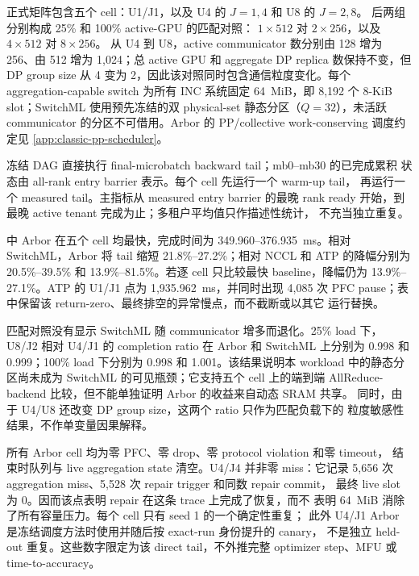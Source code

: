 正式矩阵包含五个 cell：U1/J1，以及 U4 的 $J=1,4$ 和 U8 的 $J=2,8$。
后两组分别构成 25\% 和 100\% active-GPU 的匹配对照：
$1\times512$ 对 $2\times256$，以及 $4\times512$ 对 $8\times256$。
从 U4 到 U8，active communicator 数分别由 128 增为 256、由 512 增为
1,024；总 active GPU 和 aggregate DP replica 数保持不变，但 DP group size
从 4 变为 2，因此该对照同时包含通信粒度变化。每个 aggregation-capable
switch 为所有 INC 系统固定 64~MiB，即 8,192 个 8-KiB slot；SwitchML
使用预先冻结的双 physical-set 静态分区（$Q=32$），未活跃 communicator
的分区不可借用。Arbor 的 PP/collective work-conserving 调度约定见
\cref{app:classic-pp-scheduler}。

冻结 DAG 直接执行 final-microbatch backward tail；mb0--mb30 的已完成累积
状态由 all-rank entry barrier 表示。每个 cell 先运行一个 warm-up tail，
再运行一个 measured tail。主指标从 measured entry barrier 的最晚 rank
ready 开始，到最晚 active tenant 完成为止；多租户平均值只作描述性统计，
不充当独立重复。

\begin{table}[t]
\centering
\small
\caption{70B Classic 3D final-microbatch backward-tail completion。时间单位
为 ms，越低越好；主指标取 active tenant 的最大完成时间。``最快 baseline''
在 NCCL、SwitchML 和 ATP 中逐 cell 选择，最后一列为 Arbor 相对它的时间
降幅。每个 cell 包含一个 measured iteration。}
\label{tab:llm-classic3d-tail}
\setlength{\tabcolsep}{3.5pt}
\end{table}

 中 Arbor 在五个 cell 均最快，完成时间为
349.960--376.935~ms。相对 SwitchML，Arbor 将 tail 缩短
21.8\%--27.2\%；相对 NCCL 和 ATP 的降幅分别为 20.5\%--39.5\% 和
13.9\%--81.5\%。若逐 cell 只比较最快 baseline，降幅仍为
13.9\%--27.1\%。ATP 的 U1/J1 点为 1,935.962~ms，并同时出现 4,085 次
PFC pause；表中保留该 return-zero、最终排空的异常慢点，而不截断或以其它
运行替换。

匹配对照没有显示 SwitchML 随 communicator 增多而退化。25\% load 下，
U8/J2 相对 U4/J1 的 completion ratio 在 Arbor 和 SwitchML 上分别为
0.998 和 0.999；100\% load 下分别为 0.998 和 1.001。该结果说明本 workload
中的静态分区尚未成为 SwitchML 的可见瓶颈；它支持五个 cell 上的端到端
AllReduce-backend 比较，但不能单独证明 Arbor 的收益来自动态 SRAM 共享。
同时，由于 U4/U8 还改变 DP group size，这两个 ratio 只作为匹配负载下的
粒度敏感性结果，不作单变量因果解释。

所有 Arbor cell 均为零 PFC、零 drop、零 protocol violation 和零 timeout，
结束时队列与 live aggregation state 清空。U4/J4 并非零 miss：它记录
5,656 次 aggregation miss、5,528 次 repair trigger 和同数 repair commit，
最终 live slot 为 0。因而该点表明 repair 在这条 trace 上完成了恢复，而不
表明 64~MiB 消除了所有容量压力。每个 cell 只有 seed 1 的一个确定性重复；
此外 U4/J1 Arbor 是冻结调度方法时使用并随后按 exact-run 身份提升的 canary，
不是独立 held-out 重复。这些数字限定为该 direct tail，不外推完整 optimizer
step、MFU 或 time-to-accuracy。
